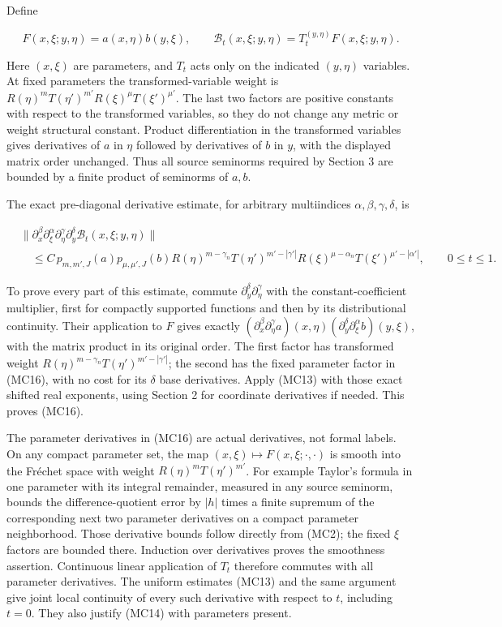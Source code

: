 \documentclass[
  11pt,
]{article}
\begin{document}
Define

\[
F(x,\xi;y,\eta)=a(x,\eta)b(y,\xi),\qquad
\mathcal B_t(x,\xi;y,\eta)=T_t^{(y,\eta)}F(x,\xi;y,\eta).
\tag{MC15}
\]

Here \((x,\xi)\) are parameters, and \(T_t\) acts only on the indicated
\((y,\eta)\) variables. At fixed parameters the transformed-variable
weight is \(R(\eta)^mT(\eta')^{m'}R(\xi)^\mu T(\xi')^{\mu'}\). The last
two factors are positive constants with respect to the transformed
variables, so they do not change any metric or weight structural
constant. Product differentiation in the transformed variables gives
derivatives of \(a\) in \(\eta\) followed by derivatives of \(b\) in
\(y\), with the displayed matrix order unchanged. Thus all source
seminorms required by Section 3 are bounded by a finite product of
seminorms of \(a,b\).

The exact pre-diagonal derivative estimate, for arbitrary multiindices
\(\alpha,\beta,\gamma,\delta\), is

\[
\begin{split}
&\|\partial_x^\beta\partial_\xi^\alpha
     \partial_\eta^\gamma\partial_y^\delta\mathcal B_t(x,\xi;y,\eta)\|\\
&\quad\leq C\,p_{m,m',J}(a)p_{\mu,\mu',J}(b)
R(\eta)^{m-\gamma_n}T(\eta')^{m'-|\gamma'|}
R(\xi)^{\mu-\alpha_n}T(\xi')^{\mu'-|\alpha'|},
\qquad 0\leq t\leq1.
\end{split}
\tag{MC16}
\]

To prove every part of this estimate, commute
\(\partial_y^\delta\partial_\eta^\gamma\) with the constant-coefficient
multiplier, first for compactly supported functions and then by its
distributional continuity. Their application to \(F\) gives exactly
\((\partial_x^\beta\partial_\eta^\gamma a)(x,\eta)
(\partial_y^\delta\partial_\xi^\alpha b)(y,\xi)\), with the matrix
product in its original order. The first factor has transformed weight
\(R(\eta)^{m-\gamma_n}T(\eta')^{m'-|\gamma'|}\); the second has the
fixed parameter factor in (MC16), with no cost for its \(\delta\) base
derivatives. Apply (MC13) with those exact shifted real exponents, using
Section 2 for coordinate derivatives if needed. This proves (MC16).

The parameter derivatives in (MC16) are actual derivatives, not formal
labels. On any compact parameter set, the map
\((x,\xi)\mapsto F(x,\xi;\cdot,\cdot)\) is smooth into the Fréchet space
with weight \(R(\eta)^mT(\eta')^{m'}\). For example Taylor's formula in
one parameter with its integral remainder, measured in any source
seminorm, bounds the difference-quotient error by \(|h|\) times a finite
supremum of the corresponding next two parameter derivatives on a
compact parameter neighborhood. Those derivative bounds follow directly
from (MC2); the fixed \(\xi\) factors are bounded there. Induction over
derivatives proves the smoothness assertion. Continuous linear
application of \(T_t\) therefore commutes with all parameter
derivatives. The uniform estimates (MC13) and the same argument give
joint local continuity of every such derivative with respect to \(t\),
including \(t=0\). They also justify (MC14) with parameters present.
\end{document}
